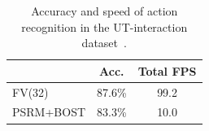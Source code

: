 \documentclass[10pt,twocolumn,letterpaper]{article}
\begin{document}
\begin{table}
\begin{center}
\begin{tabular}{|l|c|c|}
\hline
								& Acc.		& Total FPS	\\\hline
FV(32)						& 87.6\%		& 99.2		\\\hline
PSRM+BOST\cite{Yu10}	& 83.3\%		& 10.0 		\\\hline

\end{tabular}
\mbox{}\vspace{.2cm}\\
\caption{Accuracy and speed of action recognition in the UT-interaction dataset~\cite{Ryoo10}.\vspace{-.6cm}}
\label{tab:uti_comparison}
\end{center}
\end{table}
\end{document}
